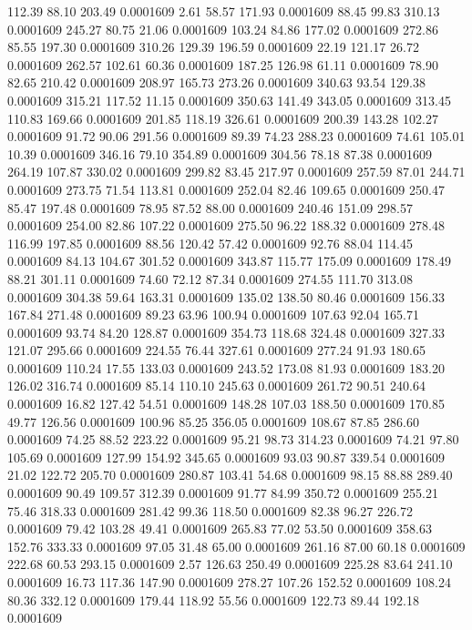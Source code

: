  112.39   88.10  203.49   0.0001609
   2.61   58.57  171.93   0.0001609
  88.45   99.83  310.13   0.0001609
 245.27   80.75   21.06   0.0001609
 103.24   84.86  177.02   0.0001609
 272.86   85.55  197.30   0.0001609
 310.26  129.39  196.59   0.0001609
  22.19  121.17   26.72   0.0001609
 262.57  102.61   60.36   0.0001609
 187.25  126.98   61.11   0.0001609
  78.90   82.65  210.42   0.0001609
 208.97  165.73  273.26   0.0001609
 340.63   93.54  129.38   0.0001609
 315.21  117.52   11.15   0.0001609
 350.63  141.49  343.05   0.0001609
 313.45  110.83  169.66   0.0001609
 201.85  118.19  326.61   0.0001609
 200.39  143.28  102.27   0.0001609
  91.72   90.06  291.56   0.0001609
  89.39   74.23  288.23   0.0001609
  74.61  105.01   10.39   0.0001609
 346.16   79.10  354.89   0.0001609
 304.56   78.18   87.38   0.0001609
 264.19  107.87  330.02   0.0001609
 299.82   83.45  217.97   0.0001609
 257.59   87.01  244.71   0.0001609
 273.75   71.54  113.81   0.0001609
 252.04   82.46  109.65   0.0001609
 250.47   85.47  197.48   0.0001609
  78.95   87.52   88.00   0.0001609
 240.46  151.09  298.57   0.0001609
 254.00   82.86  107.22   0.0001609
 275.50   96.22  188.32   0.0001609
 278.48  116.99  197.85   0.0001609
  88.56  120.42   57.42   0.0001609
  92.76   88.04  114.45   0.0001609
  84.13  104.67  301.52   0.0001609
 343.87  115.77  175.09   0.0001609
 178.49   88.21  301.11   0.0001609
  74.60   72.12   87.34   0.0001609
 274.55  111.70  313.08   0.0001609
 304.38   59.64  163.31   0.0001609
 135.02  138.50   80.46   0.0001609
 156.33  167.84  271.48   0.0001609
  89.23   63.96  100.94   0.0001609
 107.63   92.04  165.71   0.0001609
  93.74   84.20  128.87   0.0001609
 354.73  118.68  324.48   0.0001609
 327.33  121.07  295.66   0.0001609
 224.55   76.44  327.61   0.0001609
 277.24   91.93  180.65   0.0001609
 110.24   17.55  133.03   0.0001609
 243.52  173.08   81.93   0.0001609
 183.20  126.02  316.74   0.0001609
  85.14  110.10  245.63   0.0001609
 261.72   90.51  240.64   0.0001609
  16.82  127.42   54.51   0.0001609
 148.28  107.03  188.50   0.0001609
 170.85   49.77  126.56   0.0001609
 100.96   85.25  356.05   0.0001609
 108.67   87.85  286.60   0.0001609
  74.25   88.52  223.22   0.0001609
  95.21   98.73  314.23   0.0001609
  74.21   97.80  105.69   0.0001609
 127.99  154.92  345.65   0.0001609
  93.03   90.87  339.54   0.0001609
  21.02  122.72  205.70   0.0001609
 280.87  103.41   54.68   0.0001609
  98.15   88.88  289.40   0.0001609
  90.49  109.57  312.39   0.0001609
  91.77   84.99  350.72   0.0001609
 255.21   75.46  318.33   0.0001609
 281.42   99.36  118.50   0.0001609
  82.38   96.27  226.72   0.0001609
  79.42  103.28   49.41   0.0001609
 265.83   77.02   53.50   0.0001609
 358.63  152.76  333.33   0.0001609
  97.05   31.48   65.00   0.0001609
 261.16   87.00   60.18   0.0001609
 222.68   60.53  293.15   0.0001609
   2.57  126.63  250.49   0.0001609
 225.28   83.64  241.10   0.0001609
  16.73  117.36  147.90   0.0001609
 278.27  107.26  152.52   0.0001609
 108.24   80.36  332.12   0.0001609
 179.44  118.92   55.56   0.0001609
 122.73   89.44  192.18   0.0001609
